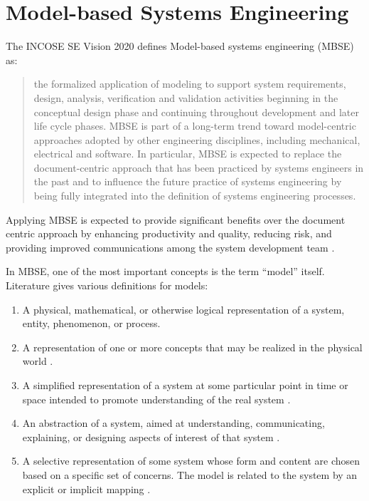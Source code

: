 \section{Model-based Systems Engineering}\label{sec:mbse}

The INCOSE SE Vision 2020 defines Model-based systems engineering (MBSE) as:

\blockquote{the formalized application of modeling to support system requirements, design, analysis, verification and validation activities beginning in the conceptual design phase and continuing throughout development and later life cycle phases. MBSE is part of a long-term trend toward model-centric approaches adopted by other engineering disciplines, including mechanical, electrical and software. In particular, MBSE is expected to replace the document-centric approach that has been practiced by systems engineers in the past and to influence the future practice of systems engineering by being fully integrated into the definition of systems engineering processes. \cite{incose-systems-engineering-2020}}

Applying MBSE is expected to provide significant benefits over the document centric approach by enhancing productivity and quality, reducing risk, and providing improved communications among the system development team \cite{omgwiki}.

In MBSE, one of the most important concepts is the term \enquote{model} itself. Literature gives various definitions for models:

\begin{enumerate}
	\item A physical, mathematical, or otherwise logical representation of a system, entity, phenomenon, or process.\cite{DoD_modeling_and_simulation}\label{item:dod}
	\item A representation of one or more concepts that may be realized in the physical world \cite{sysml_practical_guide}.
	\item A simplified representation of a system at some particular point in time or space intended to promote understanding of the real system \cite{modsim}.
	\item An abstraction of a system, aimed at understanding, communicating, explaining, or designing aspects of interest of that system \cite{object-process-methodology}.
	\item A selective representation of some system whose form and content are chosen based on a specific set of concerns. The model is related to the system by an explicit or implicit mapping \cite{ORMSC/2010-09-06}.
\end{enumerate}

